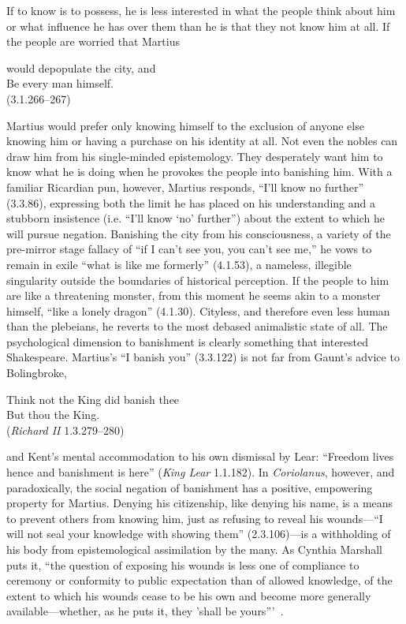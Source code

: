 If to know is to possess, he is less interested in what the people think about him or what influence he has over them than he is that they not know him at all.
If the people are worried that Martius
\begin{vq}
would depopulate the city, and\\
Be every man himself.\\
\hfill(3.1.266--267)
\end{vq}
Martius would prefer only knowing himself to the exclusion of anyone else knowing him or having a purchase on his identity at all.
Not even the nobles can draw him from his single-minded epistemology.
They desperately want him to know what he is doing when he provokes the people into banishing him.
With a familiar Ricardian pun, however, Martius responds, ``I'll know no further'' (3.3.86), expressing both the limit he has placed on his understanding and a stubborn insistence (i.e.
``I'll know `no' further'')  about the extent to which he will pursue negation.
Banishing the city from his consciousness, a variety of the pre-mirror stage fallacy of ``if I can't see you, you can't see me,'' he vows to remain in exile ``what is like me formerly'' (4.1.53), a nameless, illegible singularity outside the boundaries of historical perception.
If the people to him are like a threatening monster, from this moment he seems akin to a monster himself, ``like a lonely dragon'' (4.1.30).
Cityless, and therefore even less human than the plebeians, he reverts to the most debased animalistic state of all.
The psychological dimension to banishment is clearly something that interested Shakespeare.
Martius's ``I banish you'' (3.3.122) is not far from Gaunt's advice to Bolingbroke,
\begin{vq}
Think not the King did banish thee\\
But thou the King.\\
\hfill(\emph{Richard II} 1.3.279--280)
\end{vq}
and Kent's mental accommodation to his own dismissal by Lear: ``Freedom lives hence and banishment is here'' (\emph{King Lear} 1.1.182).
In \emph{Coriolanus}, however, and paradoxically, the social negation of banishment has a positive, empowering property for Martius.
Denying his citizenship, like denying his name, is a means to prevent others from knowing him, just as refusing to reveal his wounds---``I will not seal your knowledge with showing them'' (2.3.106)---is a withholding of his body from epistemological assimilation by the many.
As Cynthia Marshall puts it, ``the question of exposing his wounds is less one of compliance to ceremony or conformity to public expectation than of allowed knowledge, of the extent to which his wounds cease to be his own and become more generally available---whether, as he puts it, they 'shall be yours'''~\cite[102]{marshall_wound-man:_1996}.

